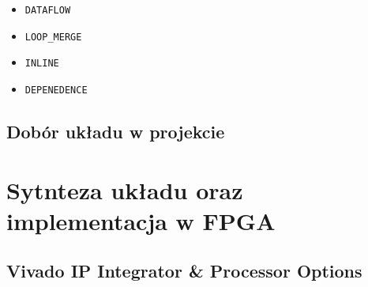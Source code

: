 \begin{itemize}
\item \texttt{DATAFLOW}


\item \texttt{LOOP\_MERGE}


\item \texttt{INLINE}
\item \texttt{DEPENEDENCE}
\end{itemize}

\subsection{Dobór układu w projekcie}

\section{Sytnteza układu oraz implementacja w FPGA}
\subsection{Vivado IP Integrator \& Processor Options}

